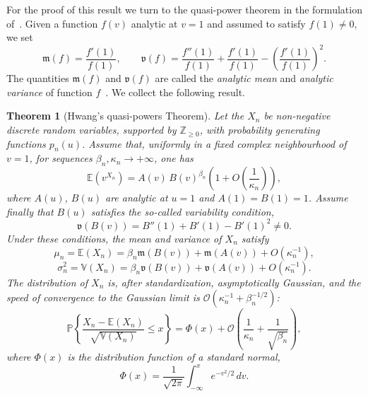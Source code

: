 \documentclass[10pt,reqno,a4paper]{amsart}
\newtheorem{theorem}{Theorem}
\theoremstyle{definition}
\def\E{{\mathbb {E}}}
\newcommand{\fm}{\ensuremath{\mathfrak{m}}}
\newcommand{\fv}{\ensuremath{\mathfrak{v}}}
\begin{document}
For the proof of this result we turn to the quasi-power theorem in the formulation of~\cite{FlaSed}. 
Given a function $f(v)$ analytic at $v = 1$ and assumed to satisfy $f(1) \neq 0$, we set
\begin{equation}
\fm(f) = \frac{f'(1)}{f(1)}, 
\qquad
\fv(f) = \frac{f''(1)}{f(1)} + \frac{f'(1)}{f(1)} - \left( \frac{f'(1)}{f(1)} \right)^2 .
\end{equation}
The quantities $\fm(f)$ and $\fv(f)$ are called the \emph{analytic mean} and \emph{analytic variance} of function $f$~\cite{FlaSed}.
We collect the following result.
\begin{theorem}[Hwang's quasi-powers Theorem]
Let the $X_n$ be non-negative discrete random variables, supported by $\mathbb{Z}_{\ge 0}$, with probability generating functions $p_n(u)$. Assume that,
uniformly in a fixed complex neighbourhood of $v = 1$, for sequences
$\beta_n, \kappa_n \to +\infty$, one has
\begin{equation*}
\E(v^{X_n})=  A(v)\, B(v)^{\beta_n} \left( 1 + O\!\left( \frac{1}{\kappa_n} \right) \right),
\end{equation*}
where $A(u)$, $B(u)$ are analytic at $u = 1$ and $A(1) = B(1) = 1$.
Assume finally that $B(u)$ satisfies the so-called variability condition,
\[
\fv(B(v))=B''(1) + B'(1) - B'(1)^2 \neq 0.
\]
Under these conditions, the mean and variance of $X_n$ satisfy
\begin{equation*}
\mu_n = \mathbb{E}(X_n)
= \beta_n \fm(B(v)) + \fm(A(v)) + O\!\left( \kappa_n^{-1} \right),
\end{equation*}
\begin{equation*}
\sigma_n^2 = \mathbb{V}(X_n)
= \beta_n \fv(B(v)) + \fv(A(v)) + O\!\left( \kappa_n^{-1} \right).
\end{equation*}
The distribution of $X_n$ is, after standardization, asymptotically Gaussian, and the
speed of convergence to the Gaussian limit is $\mathcal{O}\left( \kappa_n^{-1} + \beta_n^{-1/2} \right)$:
\begin{equation*}
\mathbb{P}\left\{
\frac{X_n - \mathbb{E}(X_n)}{\sqrt{\mathbb{V}(X_n)}} \le x
\right\}
=\Phi(x)+\mathcal{O}\left(\frac{1}{\kappa_n}+\frac{1}{\sqrt{\beta_n}}\right),
\end{equation*}
where $\Phi(x)$ is the distribution function of a standard normal,
\[
\Phi(x)=\frac{1}{\sqrt{2\pi}}
\int_{-\infty}^{x}
e^{-v^2/2}\, dv.
\]
\end{theorem}
\end{document}

